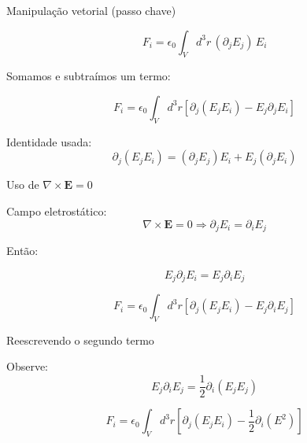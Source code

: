 \documentclass[aspectratio=169,11pt]{beamer}
\begin{document}
\begin{frame}{Manipulação vetorial (passo chave)}

\begin{eqbox}
\begin{equation}
F_i = \epsilon_0 \int_V d^3r\, (\partial_j E_j)\, E_i
\end{equation}
\end{eqbox}

Somamos e subtraímos um termo:

\begin{eqbox}
\begin{equation}
F_i = \epsilon_0 \int_V d^3r
\left[
\partial_j (E_j E_i) - E_j \partial_j E_i
\right]
\end{equation}
\end{eqbox}

\begin{mybox}
Identidade usada:
\[
\partial_j (E_j E_i) = (\partial_j E_j)E_i + E_j(\partial_j E_i)
\]
\end{mybox}

\end{frame}

\begin{frame}{Uso de $\nabla \times \mathbf E = 0$}

\begin{mybox}
Campo eletrostático:
\[
\nabla \times \mathbf E = 0
\Rightarrow \partial_j E_i = \partial_i E_j
\]
\end{mybox}

Então:

\begin{eqbox}
\begin{equation}
E_j \partial_j E_i = E_j \partial_i E_j
\end{equation}
\end{eqbox}

\begin{eqbox}
\begin{equation}
F_i = \epsilon_0 \int_V d^3r
\left[
\partial_j (E_j E_i) - E_j \partial_i E_j
\right]
\end{equation}
\end{eqbox}

\end{frame}

\begin{frame}{Reescrevendo o segundo termo}

\begin{mybox}
Observe:
\[
E_j \partial_i E_j = \frac{1}{2}\partial_i (E_j E_j)
\]
\end{mybox}

\begin{eqbox}
\begin{equation}
F_i = \epsilon_0 \int_V d^3r
\left[
\partial_j (E_j E_i)
- \frac{1}{2}\partial_i (E^2)
\right]
\label{eq:3.92}
\end{equation}
\end{eqbox}

\end{frame}
\end{document}
